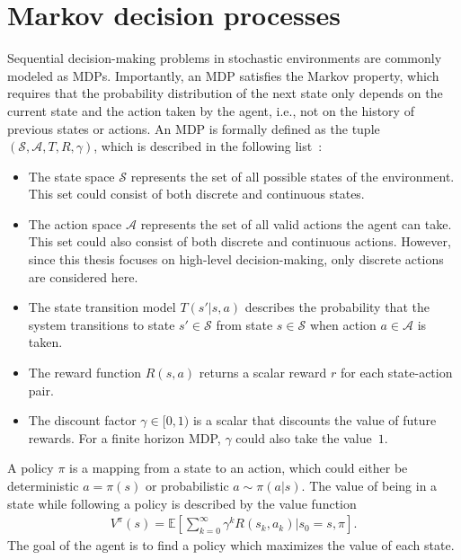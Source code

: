 \section{Markov decision processes}
\label{sec:mdp}
Sequential decision-making problems in stochastic environments are commonly modeled as MDPs. Importantly, an MDP satisfies the Markov property, which requires that the probability distribution of the next state only depends on the current state and the action taken by the agent, i.e., not on the history of previous states or actions. An MDP is formally defined as the tuple $( \mathcal{S}, \mathcal{A}, T, R, \gamma )$, which is described in the following list~\cite[Ch. 4]{Kochenderfer2015}:
%
\begin{itemize}
    \item The state space $\mathcal{S}$ represents the set of all possible states of the environment. This set could consist of both discrete and continuous states.
    \item The action space $\mathcal{A}$ represents the set of all valid actions the agent can take. This set could also consist of both discrete and continuous actions. However, since this thesis focuses on high-level decision-making, only discrete actions are considered here.
    \item The state transition model $T(s'|s,a)$ describes the probability that the system transitions to state $s' \in \mathcal{S}$ from state $s \in \mathcal{S}$ when action $a \in \mathcal{A}$ is taken.
    \item The reward function $R(s,a)$ returns a scalar reward $r$ for each state-action pair.
    \item The discount factor $\gamma \in [0,1)$ is a scalar that discounts the value of future rewards. For a finite horizon MDP, $\gamma$ could also take the value~$1$.
\end{itemize}

A policy $\pi$ is a mapping from a state to an action, which could either be deterministic $a=\pi(s)$ or probabilistic $a \sim \pi(a|s)$. The value of being in a state while following a policy is described by the value function
%
\begin{align}
    V^\pi(s) = \mathbb{E} \left[ \sum_{k=0}^\infty \gamma^k R(s_k, a_k) | s_0 = s, \pi \right].
\end{align}
%
The goal of the agent is to find a policy which maximizes the value of each state.

